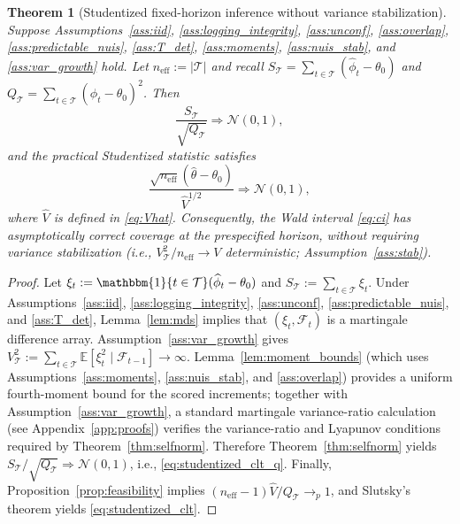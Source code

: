 \documentclass[11pt]{article}
\numberwithin{equation}{section}
\theoremstyle{plain}
\newtheorem{theorem}{Theorem}[section]
\theoremstyle{definition}
\theoremstyle{remark}
\newcommand{\E}{\mathbb{E}}
\newcommand{\ind}[1]{\mathbbm{1}\{#1\}}
\begin{document}
\begin{theorem}[Studentized fixed-horizon inference without variance stabilization]\label{thm:studentized}
Suppose Assumptions~\ref{ass:iid}, \ref{ass:logging_integrity}, \ref{ass:unconf}, \ref{ass:overlap}, \ref{ass:predictable_nuis}, \ref{ass:T_det}, \ref{ass:moments}, \ref{ass:nuis_stab}, and \ref{ass:var_growth} hold. Let $n_{\mathrm{eff}}:=|\mathcal{T}|$ and recall $S_{\mathcal{T}}=\sum_{t\in\mathcal{T}}(\widehat\phi_t-\theta_0)$ and $Q_{\mathcal{T}}=\sum_{t\in\mathcal{T}}(\widehat\phi_t-\theta_0)^2$. Then
\begin{equation}\label{eq:studentized_clt_q}
\frac{S_{\mathcal{T}}}{\sqrt{Q_{\mathcal{T}}}}\Rightarrow \mathcal{N}(0,1),
\end{equation}
and the practical Studentized statistic satisfies
\begin{equation}\label{eq:studentized_clt}
\frac{\sqrt{n_{\mathrm{eff}}}(\widehat\theta-\theta_0)}{\widehat V^{1/2}}\Rightarrow \mathcal{N}(0,1),
\end{equation}
where $\widehat V$ is defined in \eqref{eq:Vhat}. Consequently, the Wald interval \eqref{eq:ci} has asymptotically correct coverage at the prespecified horizon, without requiring variance stabilization (i.e., $V_{\mathcal{T}}^2/n_{\mathrm{eff}}\to V$ deterministic; Assumption~\ref{ass:stab}).
\end{theorem}
\begin{proof}
Let $\xi_t:=\ind{t\in\mathcal{T}}(\widehat\phi_t-\theta_0)$ and $S_{\mathcal{T}}:=\sum_{t\in\mathcal{T}}\xi_t$. Under Assumptions~\ref{ass:iid}, \ref{ass:logging_integrity}, \ref{ass:unconf}, \ref{ass:predictable_nuis}, and \ref{ass:T_det}, Lemma~\ref{lem:mds} implies that $(\xi_t,\mathcal{F}_t)$ is a martingale difference array. Assumption~\ref{ass:var_growth} gives $V_{\mathcal{T}}^2:=\sum_{t\in\mathcal{T}}\E[\xi_t^2\mid \mathcal{F}_{t-1}]\to\infty$. Lemma~\ref{lem:moment_bounds} (which uses Assumptions~\ref{ass:moments}, \ref{ass:nuis_stab}, and \ref{ass:overlap}) provides a uniform fourth-moment bound for the scored increments; together with Assumption~\ref{ass:var_growth}, a standard martingale variance-ratio calculation (see Appendix~\ref{app:proofs}) verifies the variance-ratio and Lyapunov conditions required by Theorem~\ref{thm:selfnorm}. Therefore Theorem~\ref{thm:selfnorm} yields $S_{\mathcal{T}}/\sqrt{Q_{\mathcal{T}}}\Rightarrow \mathcal{N}(0,1)$, i.e., \eqref{eq:studentized_clt_q}. Finally, Proposition~\ref{prop:feasibility} implies $(n_{\mathrm{eff}}-1)\widehat V/Q_{\mathcal{T}}\to_p 1$, and Slutsky's theorem yields \eqref{eq:studentized_clt}.
\end{proof}
\end{document}

